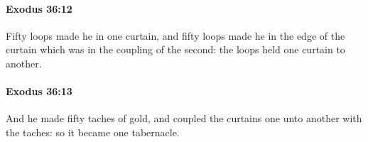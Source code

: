 		\paragraph{Exodus 36:12} %
			\label{EXODUS-36-12}

			Fifty loops made he in one curtain, and fifty loops made he in the edge of the curtain which was in the coupling of the second: the loops held one curtain to another.


		\paragraph{Exodus 36:13} %
			\label{EXODUS-36-13}

			And he made fifty taches of gold, and coupled the curtains one unto another with the taches: so it became one tabernacle.


